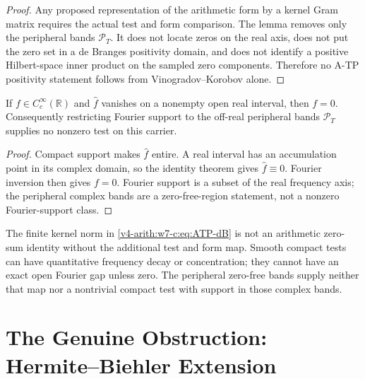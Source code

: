 \begin{proof}
Any proposed representation of the arithmetic form by a kernel
Gram matrix requires the actual test and form comparison. The lemma
removes only the
peripheral bands \(\mathcal P_T\). It does not locate zeros on the
real axis, does not put the zero set in a de Branges positivity
domain, and does not identify a positive Hilbert-space inner product
on the sampled zero components. Therefore no A-TP positivity
statement follows from Vinogradov--Korobov alone.
\end{proof}

\begin{theorem}
\label{v4-arith:w7-c:thm:ATP-strip}
If \(f\in C_c^\infty(\mathbb R)\) and \(\widehat f\) vanishes
on a nonempty open real interval, then \(f=0\). Consequently
restricting Fourier support to the off-real peripheral bands
\(\mathcal P_T\) supplies no nonzero test on this carrier.
\end{theorem}
\begin{proof}
Compact support makes \(\widehat f\) entire. A real interval
has an accumulation point in its complex domain, so the identity
theorem gives \(\widehat f\equiv0\). Fourier inversion then
gives \(f=0\). Fourier support is a subset of the real frequency
axis; the peripheral complex bands are a zero-free-region statement,
not a nonzero Fourier-support class.
\end{proof}
\begin{remark}
\label{v4-arith:w7-c:rem:VK-class-nonempty}
The finite kernel norm in \eqref{v4-arith:w7-c:eq:ATP-dB} is not
an arithmetic zero-sum identity without the additional test and form
map. Smooth compact tests can have quantitative frequency decay or
concentration; they cannot have an exact open Fourier gap unless zero.
The peripheral zero-free bands supply neither that map nor a
nontrivial compact test with support in those complex bands.
\end{remark}

\section{The Genuine Obstruction: Hermite--Biehler Extension}
\label{v4-arith:w7-c:genuine-obstruction}

